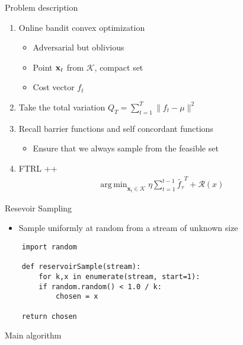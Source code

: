 \documentclass{beamer}
\DeclareMathOperator*{\argmin}{arg\,min}
\begin{document}
\begin{frame}{Problem description}
  \begin{enumerate}
    \item
    Online bandit convex optimization
    \begin{itemize}
      \item
        Adversarial but oblivious
      \item
        Point ${\bf x}_t$ from $\mathcal{K}$, compact set
      \item
        Cost vector $f_{t}$
      \end{itemize}
    \item
      Take the total variation
      $Q_T=\sum_{t=1}^T \| f_t - \mu \|^2$
    \item
      Recall barrier functions and self concordant functions
      \begin{itemize}
        \item
          Ensure that we always sample from the feasible set
        \end{itemize}
     \item
       FTRL ++
        \begin{align*}
          \argmin_{{\textbf{x}}_t\in\mathcal{K}}\eta \sum_{t=1}^{t-1} \tilde{f_{\tau}}^T + \mathcal{R}(x)
        \end{align*}

    \end{enumerate}
  \end{frame}
       
\begin{frame}[fragile]{Resevoir Sampling}
  \begin{itemize}
  \item
      Sample uniformly at random from a stream of unknown size
 \end{itemize}

  \lstset{language=Python}
  \lstset{frame=lines}
  \lstset{basicstyle=\footnotesize}
  \begin{lstlisting}
    import random

    def reservoirSample(stream):
        for k,x in enumerate(stream, start=1):
        if random.random() < 1.0 / k:
            chosen = x

    return chosen
  \end{lstlisting}
\end{frame}

\begin{frame}{Main algorithm}
  
\end{frame}
\end{document}
